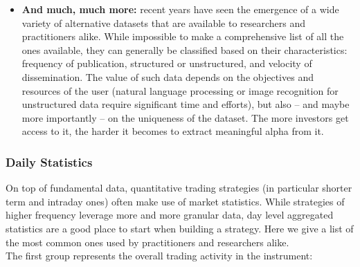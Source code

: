 \begin{itemize}
\item \textbf{And much, much more:} recent years have seen the emergence of a wide variety of alternative datasets that are available to researchers and practitioners alike.  
While impossible to make a comprehensive list of all the ones available, they can generally be classified based on their characteristics: frequency of publication, structured or unstructured, and velocity of dissemination. The value of such data depends on the objectives and resources of the user (natural language processing or image recognition for unstructured data require significant time and efforts), but also -- and maybe more importantly -- on the uniqueness of the dataset. The more investors get access to it, the harder it becomes to extract meaningful alpha from it.
\end{itemize}

\subsubsection{Daily Statistics}

On top of fundamental data, quantitative trading strategies (in particular shorter term and intraday ones) often make use of market statistics. While strategies of higher frequency leverage more and more granular data, day level aggregated statistics are a good place to start when building a strategy.
Here we give a list of the most common ones used by practitioners and researchers alike.\\

The first group represents the overall trading activity in the instrument: 

